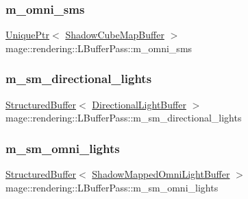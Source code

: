\subsubsection{\texorpdfstring{m\+\_\+omni\+\_\+sms}{m\_omni\_sms}}
{\footnotesize\ttfamily \mbox{\hyperlink{namespacemage_a3316d7143a973e37adf1110f2e80ca31}{Unique\+Ptr}}$<$ \mbox{\hyperlink{classmage_1_1rendering_1_1_shadow_cube_map_buffer}{Shadow\+Cube\+Map\+Buffer}} $>$ mage\+::rendering\+::\+L\+Buffer\+Pass\+::m\+\_\+omni\+\_\+sms\hspace{0.3cm}{\ttfamily [private]}}

\mbox{\label{classmage_1_1rendering_1_1_l_buffer_pass_a7509575ef1b905079ea56a6f3a4ba513}} 
\subsubsection{\texorpdfstring{m\+\_\+sm\+\_\+directional\+\_\+lights}{m\_sm\_directional\_lights}}
{\footnotesize\ttfamily \mbox{\hyperlink{classmage_1_1rendering_1_1_structured_buffer}{Structured\+Buffer}}$<$ \mbox{\hyperlink{structmage_1_1rendering_1_1_directional_light_buffer}{Directional\+Light\+Buffer}} $>$ mage\+::rendering\+::\+L\+Buffer\+Pass\+::m\+\_\+sm\+\_\+directional\+\_\+lights\hspace{0.3cm}{\ttfamily [private]}}

\mbox{\label{classmage_1_1rendering_1_1_l_buffer_pass_a3f32431790f55b3959713ae44c1847f9}} 
\subsubsection{\texorpdfstring{m\+\_\+sm\+\_\+omni\+\_\+lights}{m\_sm\_omni\_lights}}
{\footnotesize\ttfamily \mbox{\hyperlink{classmage_1_1rendering_1_1_structured_buffer}{Structured\+Buffer}}$<$ \mbox{\hyperlink{structmage_1_1rendering_1_1_shadow_mapped_omni_light_buffer}{Shadow\+Mapped\+Omni\+Light\+Buffer}} $>$ mage\+::rendering\+::\+L\+Buffer\+Pass\+::m\+\_\+sm\+\_\+omni\+\_\+lights\hspace{0.3cm}{\ttfamily [private]}}

